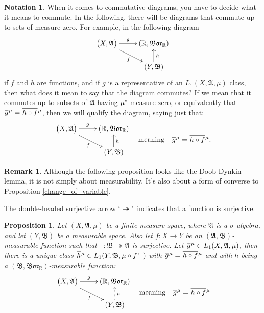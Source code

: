 \documentclass[
twoside=true,
paper=letter,
fontsize=9pt,
pagesize=auto,
leqno,
openany,
headsepline,
overfullrule,
]{scrbook}
\theoremstyle{plain}
\theoremstyle{plain}
\newtheorem{prop}[thm]{Proposition}
\theoremstyle{definition}
\newtheorem{rmk}[thm]{Remark}
\newtheorem{notn}[thm]{Notation}
\theoremstyle{bfnoteitalic}
\theoremstyle{bfnoteroman}
\newcommand{\sigalg}[1]{\mathfrak{#1}}
\newcommand{\borel}{\mathfrak{Bor}}
\newcommand{\textsigma}{\hbox{\large{$\sigma$}}\kern-1pt}
\newcommand{\preimage}[1]{\mathop{#1^{\leftarrow}}}
\newcommand{\R}{\mathbb{R}}
\newcommand{\sigmaalgebra}{\sigalg{A}}
\newcommand{\sigmaalgebraii}{\sigalg{B}}
\newcommand{\kernast}{\ast\kern-1pt}
\newcommand{\Pstar}{\measure^\kernast}
\newcommand{\Lone}{L_1(\measurespace, \sigmaalgebra, \measure)}
\newcommand{\measurespace}{X}
\newcommand{\measurespaceii}{Y}
\newcommand{\measure}{\mu}
\newcommand*\xbar[1]{%
   \hbox{%
     \vbox{%
       \hrule height 0.4pt %
       \kern0.4ex%
       \hbox{%
         \ensuremath{#1}%
       }%
     }%
   }%
}
\newcommand{\lebclass}[1]{\hspace{.5pt}\xbar{#1}\hspace{0.5pt}}
\newcommand{\ellclass}[2]{\lebclass{#1}^{#2}}
\begin{document}
\begin{notn}
When it comes to commutative diagrams, you have to decide what it means to commute.  In the following, there will be diagrams that commute up to sets of measure zero.  For example, in the following diagram
\[
\xymatrix@R=16pt{ 
\bigl( \measurespace, \sigmaalgebra \bigr) \ar[r]^-{g} 
\ar[dr]_{f}
&
(\R,\borel_\R)  
\\
&
(\measurespaceii, \sigmaalgebraii) \ar[u]_{h}
\\
}
\]
if $f$ and $h$ are functions, and if $g$ is a representative of an 
$\Lone$ class, then what does it mean to say that the diagram commutes? If we mean that it commutes up to subsets of $\sigmaalgebra$ having $\Pstar$-measure zero, or equivalently that 
$\ellclass{g}{\measure}=\ellclass{h\circ f}{\measure}$, then we will qualify the diagram, saying just that:
\[
\begin{gathered}
\xymatrix@R=16pt{ 
\bigl( \measurespace, \sigmaalgebra \bigr) \ar[r]^-{g} 
\ar[dr]_{f}
&
(\R,\borel_\R)  
\\
&
(\measurespaceii, \sigmaalgebraii) \ar[u]_{h}
\\
}
\end{gathered}
\quad
\text{meaning}
\quad
\ellclass{g}{\measure}=\ellclass{h\circ f}{\measure}.
\]
\end{notn}


\begin{rmk}
Although the following proposition looks like the Doob-Dynkin lemma, it is not simply about measurability. It's also about a form of converse to Proposition \ref{change_of_variable}.

The double-headed surjective arrow \lq$\twoheadrightarrow$\rq\ indicates that a function is surjective.
\end{rmk}



\begin{prop}\label{factoring_functions}
Let $(\measurespace, \sigmaalgebra, \measure)$  be a finite measure space, where $\sigmaalgebra$ is a \textsigma-algebra, and let $(\measurespaceii, \sigmaalgebraii)$ be a measurable space.
Also let $f:\measurespace\to\measurespaceii$ be an $(\sigmaalgebra, \sigmaalgebraii)$\hyp{}measurable function such that 
$\preimage{f}:\sigmaalgebraii \twoheadrightarrow\sigmaalgebra$ is surjective.
Let
$\ellclass{g}{\measure}
\in L_1(\measurespace, \sigmaalgebra, \measure)$,
then there is a unique class
$\ellclass{h}{\measure}
\in L_1 (\measurespaceii, \sigmaalgebraii, \measure\circ\preimage{f})$
with 
$\ellclass{g}{\measure} 
= 
\ellclass{h\circ f}{\measure}$
and with $h$ being a $(\sigmaalgebraii, \borel_\R)$\hyp{}measurable function:
\[
\begin{gathered}
\xymatrix@R=16pt{ 
\bigl( \measurespace, \sigmaalgebra \bigr) \ar[r]^-{g} 
\ar[dr]_{f}
&
(\R,\borel_\R)  
\\
&
(\measurespaceii, \sigmaalgebraii) \ar@{.>}[u]_{h}
\\
}
\end{gathered}
\quad
\text{meaning}
\quad
\ellclass{g}{\measure}=\ellclass{h\circ f}{\measure}
\]
\end{prop}
\end{document}
